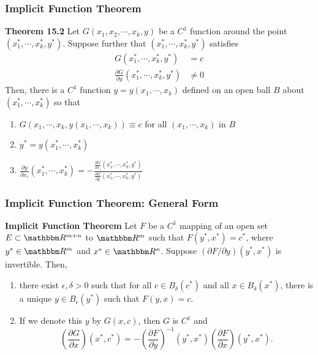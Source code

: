 \documentclass[9pt,aspectratio=169]{beamer}
\newcommand{\RR}{\mathbbm R}
\begin{document}
\begin{frame}
	\frametitle{Implicit Function Theorem}
	\begin{block}{\textbf{Theorem 15.2}}
		Let $G(x_1,x_2,\cdots,x_k,y)$ be a $C^1$ function around the point
        $(x_1^*,\cdots,x_k^*,y^*)$. Suppose further that
        $(x_1^*,\cdots,x_k^*,y^*)$ satisfies
		\begin{align}
            G(x_1^*,\cdots,x_k^*,y^*) & = c \nonumber \\ 
            \frac{\partial G}{\partial y}(x_1^*,\cdots,x_k^*,y^*)&\neq 0 \nonumber 
		\end{align}
        Then, there is a $C^1$ function $y = y(x_1,\cdots,x_k)$ defined on an
        open ball $B$ about $(x_1^*,\cdots,x_k^*)$ so that
        \begin{enumerate}
            \item[(a)] $G(x_1,\cdots,x_k,y(x_1,\cdots,x_k))\equiv c$
            for all $(x_1,\cdots,x_k)$ in $B$
            \item[(b)] $y^* = y(x_1^*,\cdots,x_k^*)$
            \item[(c)] $\frac{\partial y}{\partial x_i}(x_1^*,\cdots,x_k^*)=
            -\frac{\frac{\partial G}{\partial
                x_i}(x_1^*,\cdots,x_k^*,y^*)}{\frac{\partial G}{\partial
                y}(x_1^*,\cdots,x_k^*,y^*)}$
        \end{enumerate}
	\end{block}
\end{frame}	

\begin{frame}
    \frametitle{Implicit Function Theorem: General Form}
    \begin{block}{\bfseries Implicit Function Theorem}
        Let $F$ be a $C^1$ mapping of an open set $E \subset \RR^{m+n}$ to
        $\RR^m$ such that $F(y^*, x^*) = c^*$, where $y^* \in \RR^m$ and $x^*
        \in \RR^n$. Suppose $(\partial F / \partial y)(y^*, x^*)$ is
        invertible. Then, 
        \begin{enumerate}
            \item there exist $\epsilon, \delta > 0$ such that for all $c \in
            B_\delta(c^*)$ and all $x \in B_\delta(x^*)$, there is a unique
            $y\in B_\epsilon(y^*)$ such that $F(y, x) = c$.
            \item If we denote this $y$ by $G(x, c)$, then $G$ is $C^1$ and
            \begin{equation*}
                \left(\frac{\partial G}{\partial x}\right)(x^*, c^*) = -
                \left(\frac{\partial F}{\partial y}\right)^{-1}(y^*, x^*)
                \left(\frac{\partial F}{\partial x}\right)(y^*, x^*).
            \end{equation*}
        \end{enumerate}
    \end{block}
\end{frame}
\end{document}
